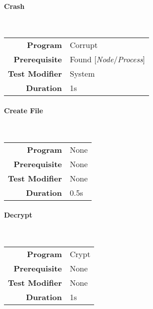 \hfill

\paragraph{Crash}
\label{par: crash}

\mbox{}\\

\begin{tabular}{rl}
    \textbf{Program}       & Corrupt                            \\
    \textbf{Prerequisite}  & Found [\emph{Node}/\emph{Process}] \\
    \textbf{Test Modifier} & System                             \\
    \textbf{Duration}      & 1s                                 \\
\end{tabular}

\hfill

\paragraph{Create File}
\label{par: create file}

\mbox{}\\

\begin{tabular}{rl}
    \textbf{Program}       & None \\
    \textbf{Prerequisite}  & None \\
    \textbf{Test Modifier} & None \\
    \textbf{Duration}      & 0.5s \\
\end{tabular}

\hfill

\paragraph{Decrypt}
\label{par: decrypt}

\mbox{}\\

\begin{tabular}{rl}
    \textbf{Program}       & Crypt \\
    \textbf{Prerequisite}  & None  \\
    \textbf{Test Modifier} & None  \\
    \textbf{Duration}      & 1s    \\
\end{tabular}

